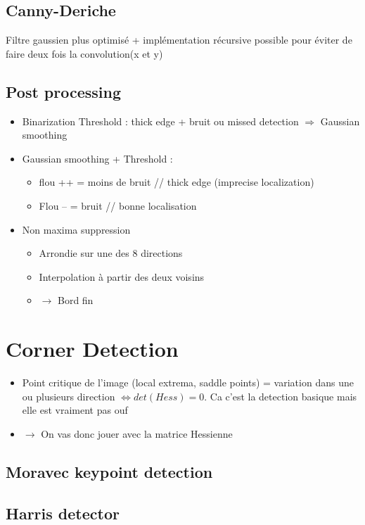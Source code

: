 \documentclass{article}
\theoremstyle{plain}%
\theoremstyle{definition}
\theoremstyle{remark}
\begin{document}
\subsection{Canny-Deriche}
Filtre gaussien plus optimisé + implémentation récursive possible pour éviter de faire deux fois la convolution(x et y)

\subsection{Post processing}
\begin{itemize}
    \item Binarization Threshold : thick edge + bruit ou missed detection $\Rightarrow$ Gaussian smoothing 
    \item Gaussian smoothing + Threshold : \begin{itemize}
        \item flou ++ = moins de bruit // thick edge (imprecise localization)
        \item Flou -- = bruit // bonne localisation
    \end{itemize}
    \item Non maxima suppression \begin{itemize}
        \item Arrondie sur une des 8 directions 
        \item Interpolation à partir des deux voisins 
        \item $\rightarrow$ Bord fin 
    \end{itemize}
\end{itemize}


\section{Corner Detection}
\begin{itemize}
    \item Point critique de l'image (local extrema, saddle points) = variation dans une ou plusieurs direction $ \Leftrightarrow det(Hess) = 0 $. Ca c'est la detection basique mais elle est vraiment pas ouf
    \item $\rightarrow$ On vas donc jouer avec la matrice Hessienne
\end{itemize}

\subsection{Moravec keypoint detection}
\subsection{Harris detector}
\end{document}
